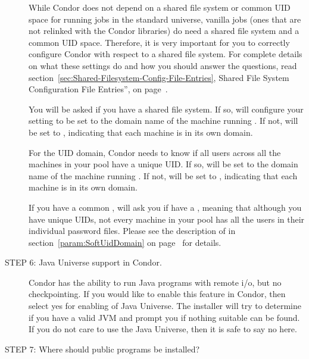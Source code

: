 \begin{description}
     While Condor does not depend on a shared file system or common UID
     space for running jobs in the standard universe,
     vanilla jobs (ones that are not relinked with the Condor
     libraries) do need a shared file system and a common UID space.  
     Therefore, it is very important for you to correctly configure
     Condor with respect to a shared file system.
     For complete details on what these settings do and how you
     should answer the questions, read
     section~\ref{sec:Shared-Filesystem-Config-File-Entries},
     Shared File System Configuration File Entries'', on
     page~\pageref{sec:Shared-Filesystem-Config-File-Entries}.

     You will be asked if you have a shared file system.  If so,
      will configure your  
     setting to be set to the domain name of the machine running
     .
     If not,  will be set to
     , indicating that each machine is in its
     own domain.

     For the UID domain, Condor needs to know if all users across all
     the machines in your pool have a unique UID.  
     If so,  will be set to the domain name of the
     machine running . 
     If not,  will be set to
     , indicating that each machine is in its 
     own domain.

     If you have a common ,  will
     ask you if have a , meaning that although
     you have unique UIDs, not every machine in your pool has all the
     users in their individual password files.  Please see the
     description of  in
     section~\ref{param:SoftUidDomain} on
     page~\pageref{param:SoftUidDomain} for details.  

\item[STEP 6: Java Universe support in Condor.]

	Condor has the ability to run Java programs with remote i/o,
	but no checkpointing. If you would like to enable this feature
	in Condor, then select yes for enabling of Java Universe. The
	installer will try to determine if you have a valid JVM and
	prompt you if nothing suitable can be found. If you do not care
	to use the Java Universe, then it is safe to say no here.

\item[STEP 7: Where should public programs be installed?]


\end{description}
